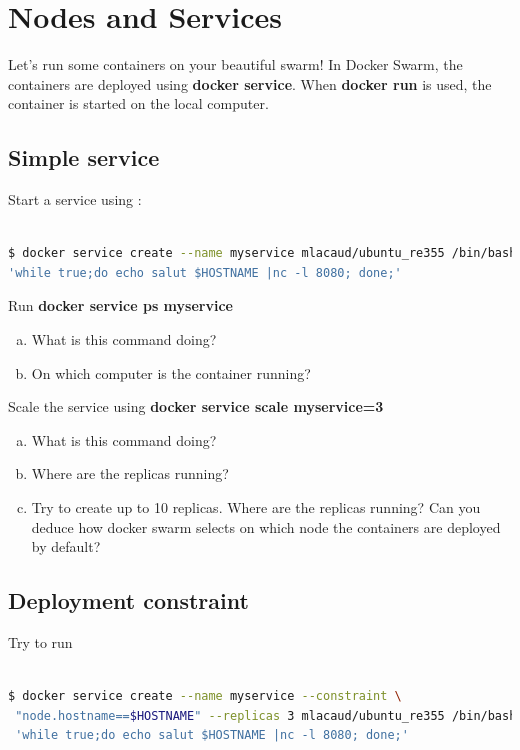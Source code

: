 \documentclass[a4paper,11pt]{exam}
\begin{document}
\section{Nodes and Services}

Let's run some containers on your beautiful swarm! In Docker Swarm, 
the containers are deployed using \textbf{docker service}. 
When \textbf{docker run} is used, the container is started 
on the local computer.
\subsection{Simple service}
Start a service using : 
\begin{lstlisting}[frame=single,language={sh}]  % Start your code-block

$ docker service create --name myservice mlacaud/ubuntu_re355 /bin/bash -c \
'while true;do echo salut $HOSTNAME |nc -l 8080; done;'

\end{lstlisting}

\begin{questions}
	\question Run \textbf{docker service ps myservice}
	\begin{enumerate}[(a)]
		\item What is this command doing?
		\item On which computer is the container running?
	\end{enumerate}
Scale the service using \textbf{docker service scale myservice=3}
	\begin{enumerate}[(c)]
		\item What is this command doing?
		\item Where are the replicas running?
		\item Try to create up to 10 replicas. Where are the replicas running? Can you deduce how docker swarm selects on which node the containers are deployed by default? 
	\end{enumerate}
\end{questions}

\subsection{Deployment constraint}

Try to run 
\begin{lstlisting}[frame=single,language={sh}]  % Start your code-block

$ docker service create --name myservice --constraint \
 "node.hostname==$HOSTNAME" --replicas 3 mlacaud/ubuntu_re355 /bin/bash -c \
 'while true;do echo salut $HOSTNAME |nc -l 8080; done;'
\end{lstlisting}
\end{document}
